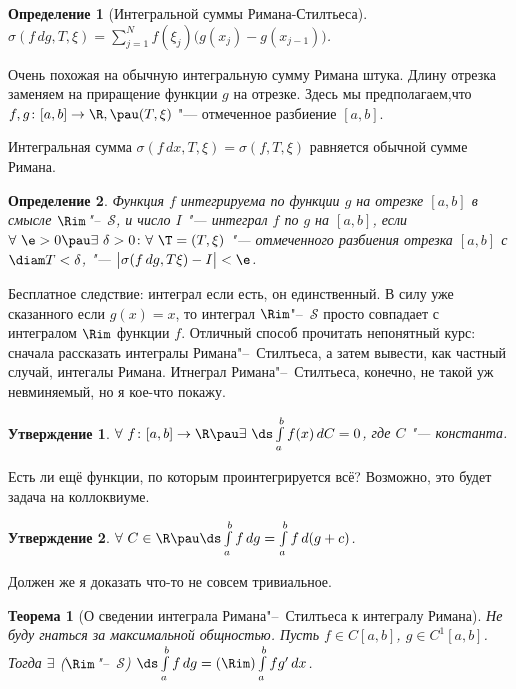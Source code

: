 \documentclass[a4paper,10pt,twoside]{article}
\newtheorem{Def}{Определение}[section]
\newtheorem{The}{Теорема}[section]
\newtheorem{Ut}{Утверждение}[section]
\newenvironment{Zam}
     	{\par\noindent{\textbf{Замечание.}}}{}
\begin{document}
	\begin{Def}[Интегральной суммы Римана-Стилтьеса]
		$\sigma(f\,dg,T,\xi)=\sum\limits_{j=1}^Nf(\xi_j)\big(g(x_j)-g(x_{j-1})\big)$.
	\end{Def}
	
	Очень похожая на обычную интегральную сумму Римана штука. Длину отрезка заменяем на приращение функции $g$ на отрезке.
	Здесь мы предполагаем,что $f,g\colon [a,b]\to\R,\pau(T,\xi)$ "--- отмеченное разбиение $[a,b]$.
	\begin{Zam}
	Интегральная сумма $\sigma(f\,dx,T,\xi)=\sigma(f,T,\xi)$ равняется обычной сумме Римана.
	\end{Zam}
	\begin{Def}\label{Stil}
	Функция $f$ интегрируема по функции $g$ на отрезке $[a,b]$ в смысле $\Rim$"--~$\mathcal S$, и число $I$ "--- интеграл $f$ по $g$
	на $[a,b]$, если $\forall\ \e>0\pau\exists\ \delta>0\colon \forall\ \T=(T,\xi)$ "--- отмеченного разбиения отрезка $[a,b]$ с $\diam T<\delta$, "---
	$\big|\sigma(f\,dg,T\xi)-I\big|<\e$.
	\end{Def}
	Бесплатное следствие: интеграл если есть, он единственный. В силу уже сказанного если $g(x)=x$, то интеграл $\Rim$"--~$\mathcal S$
	просто совпадает с интегралом $\Rim$ функции $f$. Отличный способ прочитать непонятный курс: сначала рассказать интегралы Римана"--~Стилтьеса,
	а затем вывести, как частный случай, интегалы Римана. Итнеграл Римана"--~Стилтьеса, конечно, не такой уж невминяемый, но я кое-что покажу.
	\begin{Ut}
	$\forall\  f\colon [a,b]\to\R\pau\exists\ \ds\int\limits_a^bf(x)\,dC=0$, где $C$ "--- константа.
	\end{Ut}
	Есть ли ещё функции, по которым проинтегрируется всё? Возможно, это будет задача на коллоквиуме.
	\begin{Ut}
	$\forall\  C\in\R\pau\ds\int\limits_a^bf\,dg=\int\limits_a^bf\,d(g+c)$.
	\end{Ut}
	Должен же я доказать что-то не совсем тривиальное.
	\begin{The}[О сведении интеграла Римана"--~Стилтьеса к интегралу Римана]
	Не буду гнаться за максимальной общностью. Пусть $f\in C[a,b]$, $g\in C^1[a,b]$. Тогда $\exists$ ($\Rim$"--~$\mathcal S$)
	$\ds\int\limits_a^bf\,dg=(\Rim)\int\limits_a^bfg'\,dx$.
	\end{The}
\end{document}
